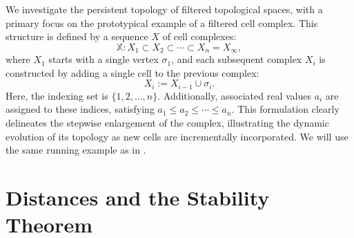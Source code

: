 We investigate the persistent topology of filtered topological spaces, with a primary focus on the prototypical example of a filtered cell complex. This structure is defined by a sequence \(X\) of cell complexes:
\begin{equation*}
\mathbb{X} : X_1 \subset X_2 \subset \cdots \subset X_n = X_{\infty},
\end{equation*}
where \(X_1\) starts with a single vertex \( \sigma_1 \), and each subsequent complex \(X_i\) is constructed by adding a single cell to the previous complex:
\begin{equation*}
X_i := X_{i-1} \cup \sigma_i.
\end{equation*}
Here, the indexing set is \( \{1, 2, \ldots, n\} \). Additionally, associated real values \(a_i\) are assigned to these indices, satisfying $a_1 \leq a_2 \leq \cdots \leq a_n.$ This formulation clearly delineates the stepwise enlargement of the complex, illustrating the dynamic evolution of its topology as new cells are incrementally incorporated. We will use the same running example as in \cite[§2.2]{de2011dualities}.

\section{Distances and the Stability Theorem}
